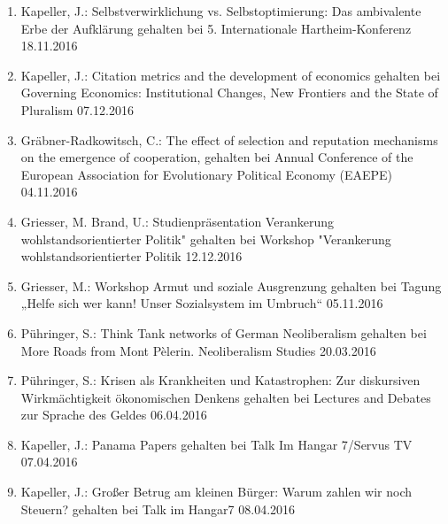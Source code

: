 \begin{enumerate}
	\item Kapeller, J.: Selbstverwirklichung vs. Selbstoptimierung: Das ambivalente Erbe der Aufklärung gehalten bei 5. Internationale Hartheim-Konferenz 18.11.2016
	\item Kapeller, J.: Citation metrics and the development of economics gehalten bei Governing Economics: Institutional Changes, New Frontiers and the State of Pluralism 07.12.2016
	\item Gräbner-Radkowitsch, C.: The effect of selection and reputation mechanisms on the emergence of cooperation, gehalten bei Annual Conference of the European Association for Evolutionary Political Economy (EAEPE) 04.11.2016
	\item Griesser, M. Brand, U.: Studienpräsentation \glqq Verankerung wohlstandsorientierter Politik" gehalten bei Workshop "Verankerung wohlstandsorientierter Politik\grqq{} 12.12.2016
	\item Griesser, M.: Workshop \glqq Armut und soziale Ausgrenzung\grqq{} gehalten bei Tagung „Helfe sich wer kann! Unser Sozialsystem im Umbruch“ 05.11.2016
	\item Pühringer, S.: Think Tank networks of German Neoliberalism gehalten bei More Roads from Mont Pèlerin. Neoliberalism Studies 20.03.2016
	\item Pühringer, S.: Krisen als Krankheiten und Katastrophen: Zur diskursiven Wirkmächtigkeit ökonomischen Denkens gehalten bei Lectures and Debates zur \glqq Sprache des Geldes\grqq{} 06.04.2016
	\item Kapeller, J.: Panama Papers gehalten bei Talk Im Hangar 7/Servus TV 07.04.2016
	\item Kapeller, J.: Großer Betrug am kleinen Bürger: Warum zahlen wir noch Steuern? gehalten bei Talk im Hangar7 08.04.2016
\end{enumerate}
